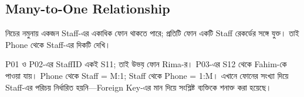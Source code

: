 \subsection{Many-to-One Relationship}

নিচের নমুনায় একজন Staff-এর একাধিক ফোন থাকতে পারে; প্রতিটি ফোন একটি
Staff রেকর্ডের সঙ্গে যুক্ত। তাই Phone থেকে Staff-এর দিকটি দেখি।



P01 ও P02-এর StaffID একই S11; তাই উভয় ফোন Rima-র। P03-এর S12
থেকে Fahim-কে পাওয়া যায়। Phone থেকে Staff = M:1; Staff থেকে Phone = 1:M।
এখানে ফোনের সংখ্যা দিয়ে Staff-এর পরিচয় নির্ধারিত হয়নি—Foreign Key-এর
মান দিয়ে সংশ্লিষ্ট ব্যক্তিকে শনাক্ত করা হয়েছে।





